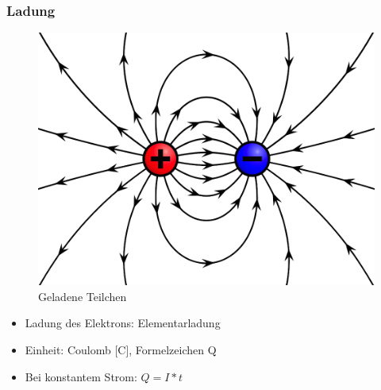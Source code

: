 \begin{frame}
  \frametitle{Ladung}
	  \begin{minipage}{0.4\textwidth}
	    \begin{figure}
	      \includegraphics[width=\textwidth,height=.85\textheight,keepaspectratio]{e02/ladung.png}
	      \caption{Geladene Teilchen \cite{charge}}
	    \end{figure}
	  \end{minipage}
  \begin{minipage}{0.5\textwidth}
  	\begin{itemize}
  		\item Ladung des Elektrons: Elementarladung
  		\item Einheit: Coulomb [C], Formelzeichen Q
  		\item Bei konstantem Strom: $Q = I*t$
  	\end{itemize}
  \end{minipage}
\end{frame}



